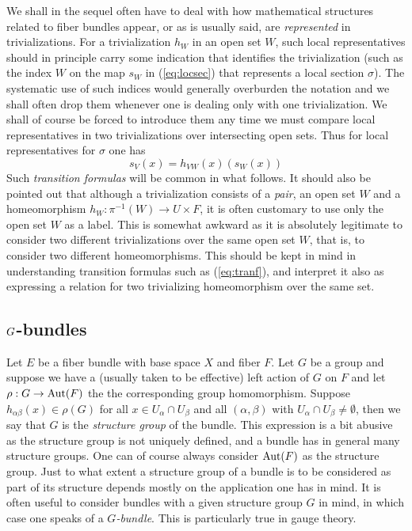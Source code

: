 \documentclass[12pt,titlepage]{article}
\def\Aut{\hbox{Aut}}
\begin{document}
We shall in the sequel often have to deal with how mathematical
structures related to fiber bundles appear, or as is usually said,
are {\em represented\/} in  trivializations. For
a  trivialization \(h_W\) in an open set \(W\), such local
representatives
%
 should in principle carry some indication that
identifies the  trivialization (such as the index \(W\) on the map
\(s_W\) in (\ref{eq:locsec}) that represents a local section \(\sigma\)). 
The systematic use
of such indices would generally overburden the notation and we shall
often drop them whenever one is dealing only with one  
trivialization.
We shall of course be forced to introduce them any time we must compare
local representatives in two  trivializations over intersecting open
sets. Thus for local representatives for \(\sigma\) 
 one has
\begin{equation}\label{eq:tranf}
s_V(x) = h_{VW}(x)(s_W(x))
\end{equation}
 Such {\em transition formulas\/}
%
 will be common in what follows. It should also be pointed out that
although a  trivialization consists of a {\em pair\/}, an 
open set \(W\)
and a homeomorphism \(h_W:\pi^{-1}(W)\to U\times F\), it is often customary
to use only the open set \(W\) as a label. This is somewhat awkward
as it is absolutely legitimate to consider two different 
trivializations over the same open set \(W\), that is, to consider two
different homeomorphisms. This should be kept in mind in understanding 
transition formulas such as (\ref{eq:tranf}), and  
interpret it also 
as expressing a relation for two 
trivializing homeomorphism over the same set.

\subsection{\protect\(G\protect\)-bundles}
Let \(E\) be a fiber bundle with base space \(X\) and fiber \(F\). 
Let \(G\) be a group and suppose we have a
(usually taken to be effective) left action of
\(G\) on \(F\)  and let \(\rho:G \to \Aut(F)\) the the corresponding
group homomorphism. Suppose \(h_{\alpha\beta}(x) \in
\rho(G)\) for all \(x\in U_\alpha\cap U_\beta\)
and all \((\alpha,\beta)\) with \(U_\alpha\cap U_\beta\neq\emptyset\), 
then we say that \(G\) is the {\em structure group\/}
%
of the bundle.  This expression is a bit abusive
as the structure group is not uniquely defined, and a bundle has in
general many structure groups. One can of course always consider
\(\Aut(F)\) as the structure group.  Just to what
extent a structure group of a bundle is to be considered as part of its
structure depends mostly on the application one has in mind. It is often
useful to consider bundles with a  given structure group \(G\) in mind, in
which case one speaks of a  {\em \(G\)-bundle\/}.
%
This is particularly true  in gauge theory.
 
\end{document}
